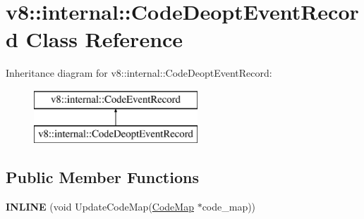 \hypertarget{classv8_1_1internal_1_1_code_deopt_event_record}{}\section{v8\+:\+:internal\+:\+:Code\+Deopt\+Event\+Record Class Reference}
\label{classv8_1_1internal_1_1_code_deopt_event_record}
Inheritance diagram for v8\+:\+:internal\+:\+:Code\+Deopt\+Event\+Record\+:\begin{figure}[H]
\begin{center}
\leavevmode
\includegraphics[height=2.000000cm]{classv8_1_1internal_1_1_code_deopt_event_record}
\end{center}
\end{figure}
\subsection*{Public Member Functions}
\begin{DoxyCompactItemize}
\item 
{\bfseries I\+N\+L\+I\+NE} (void Update\+Code\+Map(\hyperlink{classv8_1_1internal_1_1_code_map}{Code\+Map} $\ast$code\+\_\+map))\hypertarget{classv8_1_1internal_1_1_code_deopt_event_record_a27832918af65252d7000134205e274e7}{}\label{classv8_1_1internal_1_1_code_deopt_event_record_a27832918af65252d7000134205e274e7}

\end{DoxyCompactItemize}
